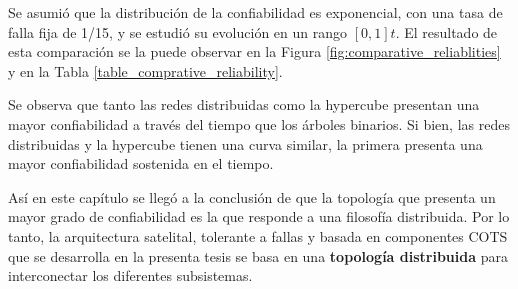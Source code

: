 Se asumió que la distribución de la confiabilidad es exponencial, con una tasa de falla fija de 1/15, y se estudió su evolución en un rango $[0,1]t$. El resultado de esta comparación se la puede observar en la Figura \ref{fig:comparative_reliablities} y en la Tabla \ref{table_comprative_reliability}.

Se observa que tanto las redes distribuidas como la hypercube presentan una mayor confiabilidad a través del tiempo que  los árboles binarios. Si bien, las redes distribuidas y la hypercube tienen una curva similar, la primera presenta una mayor confiabilidad sostenida en el tiempo.

Así en este capítulo se llegó a la conclusión de que la topología que presenta un mayor grado de
confiabilidad es la que responde a una filosofía distribuida.  Por lo tanto, la arquitectura satelital, tolerante a fallas y basada en componentes COTS que se desarrolla en la presenta tesis se basa en una \textbf{topología distribuida} para interconectar los diferentes subsistemas.
